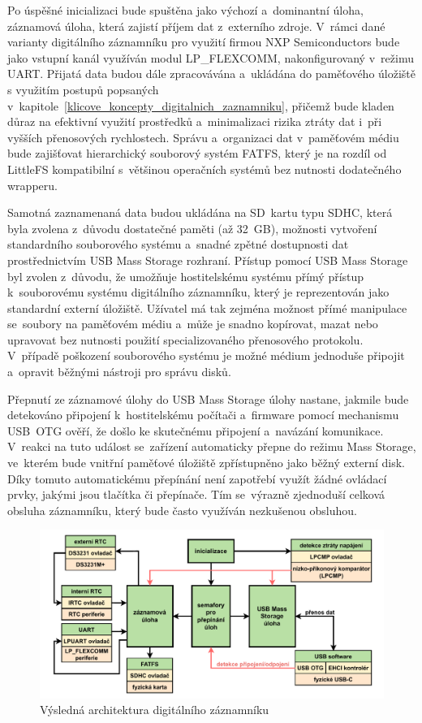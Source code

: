 Po úspěšné inicializaci bude spuštěna jako výchozí a~dominantní úloha, záznamová úloha, která zajistí příjem dat z~externího zdroje. V~rámci dané varianty digitálního záznamníku pro využití firmou NXP Semiconductors bude jako vstupní kanál využíván modul LP\_FLEXCOMM, nakonfigurovaný v~režimu UART. Přijatá data budou dále zpracovávána a~ukládána do paměťového úložiště s využitím postupů popsaných v~kapitole~\ref{klicove_koncepty_digitalnich_zaznamniku}, přičemž bude kladen důraz na efektivní využití prostředků a~minimalizaci rizika ztráty dat i~při vyšších přenosových rychlostech. Správu a~organizaci dat v~paměťovém médiu bude zajišťovat hierarchický souborový systém FATFS, který je na rozdíl od LittleFS kompatibilní s~většinou operačních systémů bez nutnosti dodatečného wrapperu.

Samotná zaznamenaná data budou ukládána na SD~kartu typu SDHC, která byla zvolena z~důvodu dostatečné paměti (až 32~GB), možnosti vytvoření standardního souborového systému a~snadné zpětné dostupnosti dat prostřednictvím USB Mass Storage rozhraní. Přístup pomocí USB Mass Storage byl zvolen z~důvodu, že umožňuje hostitelskému systému přímý přístup k~souborovému systému digitálního záznamníku, který je reprezentován jako standardní externí úložiště. Užívatel má tak zejména možnost přímé manipulace se~soubory na paměťovém médiu a~může je snadno kopírovat, mazat nebo upravovat bez nutnosti použití specializovaného přenosového protokolu. V~případě poškození souborového systému je možné médium jednoduše připojit a~opravit běžnými nástroji pro správu disků.

Přepnutí ze záznamové úlohy do USB Mass Storage úlohy nastane, jakmile bude detekováno připojení k~hostitelskému počítači a~firmware pomocí mechanismu USB~OTG ověří, že došlo ke skutečnému připojení a~navázání komunikace. V~reakci na tuto událost se~zařízení automaticky přepne do režimu Mass Storage, ve~kterém bude vnitřní paměťové úložiště zpřístupněno jako běžný externí disk. Díky tomuto automatickému přepínání není zapotřebí využít žádné ovládací prvky, jakými jsou tlačítka či přepínače. Tím se~výrazně zjednoduší celková obsluha záznamníku, který bude často využíván nezkušenou obsluhou.

\begin{figure}[h]
    \centering
    \includegraphics[width=1.00\textwidth]{obrazky-figures/system_architecture.pdf}
    
    \caption{Výsledná architektura digitálního záznamníku}
    \label{fig:system-architecture}
\end{figure}

